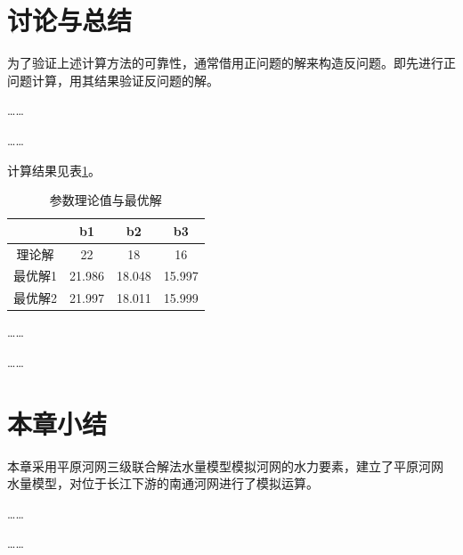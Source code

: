 \section{讨论与总结}
为了验证上述计算方法的可靠性，通常借用正问题的解来构造反问题。即先进行正问题计算，用其结果验证反问题的解。\par
……\par
……\par
计算结果见表\ref{tab:parameter}。

\begin{table}[H]\small	%
	\centering
	\caption{参数理论值与最优解} \label{tab:parameter}
	\begin{tabular*}{0.75\textwidth}{@{\extracolsep{\fill}}cccc}
		\toprule
		\multicolumn{1}{l}{} & b1     & b2     & b3     \\\midrule
		理论解                  & 22     & 18     & 16     \\
		最优解1                 & 21.986 & 18.048 & 15.997 \\
		最优解2                 & 21.997 & 18.011 & 15.999 \\ \bottomrule
	\end{tabular*}%
\end{table}


……\par
……
\section{本章小结}
本章采用平原河网三级联合解法水量模型模拟河网的水力要素，建立了平原河网
水量模型，对位于长江下游的南通河网进行了模拟运算。\par
……\par
……
